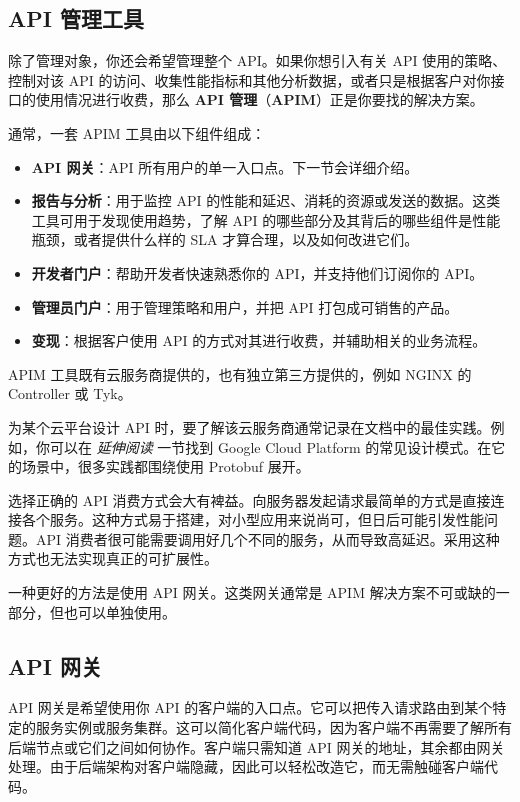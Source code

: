 \subsection{API 管理工具}

\label{idx:430}
\label{idx:431}
除了管理对象，你还会希望管理整个 API。如果你想引入有关 API 使用的策略、控制对该 API 的访问、收集性能指标和其他分析数据，或者只是根据客户对你接口的使用情况进行收费，那么 \textbf{API 管理}（\textbf{APIM}）正是你要找的解决方案。

通常，一套 APIM 工具由以下组件组成：

\begin{itemize}
\item \textbf{API 网关}：API 所有用户的单一入口点。下一节会详细介绍。
\item \textbf{报告与分析}：用于监控 API 的性能和延迟、消耗的资源或发送的数据。这类工具可用于发现使用趋势，了解 API 的哪些部分及其背后的哪些组件是性能瓶颈，或者提供什么样的 SLA 才算合理，以及如何改进它们。
\item \textbf{开发者门户}：帮助开发者快速熟悉你的 API，并支持他们订阅你的 API。
\item \textbf{管理员门户}：用于管理策略和用户，并把 API 打包成可销售的产品。
\item \textbf{变现}：根据客户使用 API 的方式对其进行收费，并辅助相关的业务流程。
\end{itemize}

\label{idx:432}
APIM 工具既有云服务商提供的，也有独立第三方提供的，例如 NGINX 的 Controller 或 Tyk。

\label{idx:433}
为某个云平台设计 API 时，要了解该云服务商通常记录在文档中的最佳实践。例如，你可以在 \emph{延伸阅读} 一节找到 Google Cloud Platform 的常见设计模式。在它的场景中，很多实践都围绕使用 Protobuf 展开。

选择正确的 API 消费方式会大有裨益。向服务器发起请求最简单的方式是直接连接各个服务。这种方式易于搭建，对小型应用来说尚可，但日后可能引发性能问题。API 消费者很可能需要调用好几个不同的服务，从而导致高延迟。采用这种方式也无法实现真正的可扩展性。

一种更好的方法是使用 API 网关。这类网关通常是 APIM 解决方案不可或缺的一部分，但也可以单独使用。

\subsection{API 网关}

\label{idx:434}
API 网关是希望使用你 API 的客户端的入口点。它可以把传入请求路由到某个特定的服务实例或服务集群。这可以简化客户端代码，因为客户端不再需要了解所有后端节点或它们之间如何协作。客户端只需知道 API 网关的地址，其余都由网关处理。由于后端架构对客户端隐藏，因此可以轻松改造它，而无需触碰客户端代码。

